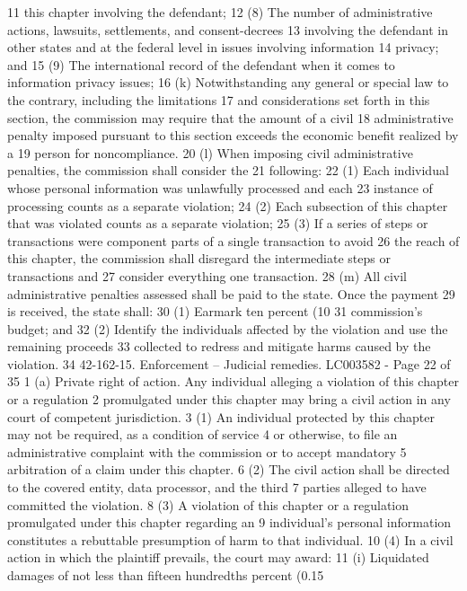 11 this chapter involving the defendant;
12 (8) The number of administrative actions, lawsuits, settlements, and consent-decrees
13 involving the defendant in other states and at the federal level in issues involving information
14 privacy; and
15 (9) The international record of the defendant when it comes to information privacy issues;
16 (k) Notwithstanding any general or special law to the contrary, including the limitations
17 and considerations set forth in this section, the commission may require that the amount of a civil
18 administrative penalty imposed pursuant to this section exceeds the economic benefit realized by a
19 person for noncompliance.
20 (l) When imposing civil administrative penalties, the commission shall consider the
21 following:
22 (1) Each individual whose personal information was unlawfully processed and each
23 instance of processing counts as a separate violation;
24 (2) Each subsection of this chapter that was violated counts as a separate violation;
25 (3) If a series of steps or transactions were component parts of a single transaction to avoid
26 the reach of this chapter, the commission shall disregard the intermediate steps or transactions and
27 consider everything one transaction.
28 (m) All civil administrative penalties assessed shall be paid to the state. Once the payment
29 is received, the state shall:
30 (1) Earmark ten percent (10%
31 commission's budget; and
32 (2) Identify the individuals affected by the violation and use the remaining proceeds
33 collected to redress and mitigate harms caused by the violation.
34 42-162-15. Enforcement -- Judicial remedies.
LC003582 - Page 22 of 35
1 (a) Private right of action. Any individual alleging a violation of this chapter or a regulation
2 promulgated under this chapter may bring a civil action in any court of competent jurisdiction.
3 (1) An individual protected by this chapter may not be required, as a condition of service
4 or otherwise, to file an administrative complaint with the commission or to accept mandatory
5 arbitration of a claim under this chapter.
6 (2) The civil action shall be directed to the covered entity, data processor, and the third
7 parties alleged to have committed the violation.
8 (3) A violation of this chapter or a regulation promulgated under this chapter regarding an
9 individual's personal information constitutes a rebuttable presumption of harm to that individual.
10 (4) In a civil action in which the plaintiff prevails, the court may award:
11 (i) Liquidated damages of not less than fifteen hundredths percent (0.15%
